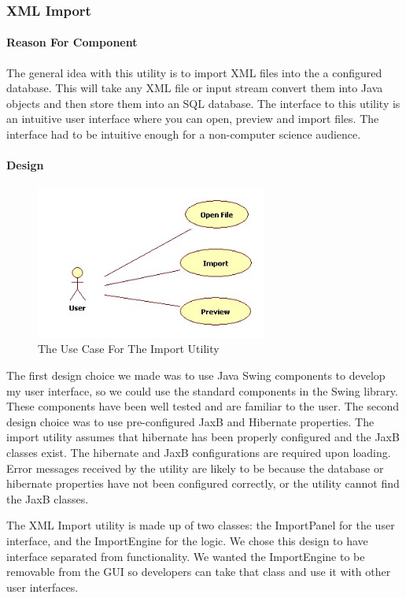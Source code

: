 \subsubsection{XML Import}
\paragraph{Reason For Component}

The general idea with this utility is to import XML files into the a configured database. This will take any XML file or input stream convert them into Java objects and then store them into an SQL database. The interface to this utility is an intuitive user interface where you can open, preview and import files. The interface had to be intuitive enough for a non-computer science audience. 


\paragraph{Design}
\begin{figure}[h]
	\centering
		\includegraphics[width=3.00in]{Images/ImportUse.jpg}
	\caption{The Use Case For The Import Utility}
	\label{fig:Import Use}
\end{figure}
\par
The first design choice we made was to use Java Swing components to develop my user interface, so we could use the standard components in the Swing library. These components have been well tested and are familiar to the user. The second design choice was to use pre-configured JaxB and Hibernate properties. The import utility assumes that hibernate has been properly configured and the JaxB classes exist. The hibernate and JaxB configurations are required upon loading. Error messages received by the utility are likely to be because the database or hibernate properties have not been configured correctly, or the utility cannot find the JaxB classes. 
\par
The XML Import utility is made up of two classes: the ImportPanel for the user interface, and the ImportEngine for the logic. We chose this design to have interface separated from functionality. We wanted the ImportEngine to be removable from the GUI so developers can take that class and use it with other user interfaces. 
